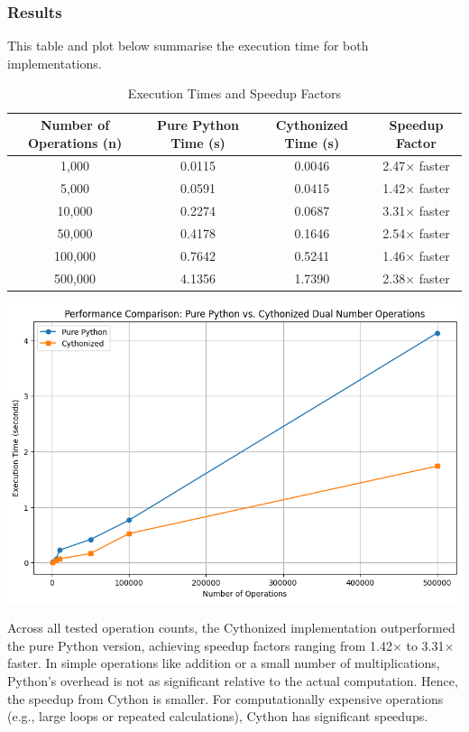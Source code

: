 \documentclass[12.5pt]{article}
\begin{document}
\subsubsection{Results}
This table and plot below summarise the execution time for both implementations.
\begin{table}[h!]
\centering
\caption{Execution Times and Speedup Factors}
\label{tab:execution_times}
\begin{tabular}{|c|c|c|c|}
\hline
\textbf{Number of Operations (n)} & \textbf{Pure Python Time (s)} & \textbf{Cythonized Time (s)} & \textbf{Speedup Factor} \\ \hline
1,000 & 0.0115 & 0.0046 & 2.47× faster \\ \hline
5,000 & 0.0591 & 0.0415 & 1.42× faster \\ \hline
10,000 & 0.2274 & 0.0687 & 3.31× faster \\ \hline
50,000 & 0.4178 & 0.1646 & 2.54× faster \\ \hline
100,000 & 0.7642 & 0.5241 & 1.46× faster \\ \hline
500,000 & 4.1356 & 1.7390 & 2.38× faster \\ \hline
\end{tabular}
\end{table}
\begin{center}
    \includegraphics[scale=0.75]{task9.png}
\end{center}

Across all tested operation counts, the Cythonized implementation outperformed the pure Python version, achieving speedup factors ranging from 1.42× to 3.31× faster. In simple operations like addition or a small number of multiplications, Python's overhead is not as significant relative to the actual computation. Hence, the speedup from Cython is smaller. For computationally expensive operations (e.g., large loops or repeated calculations), Cython has significant speedups.
\end{document}

